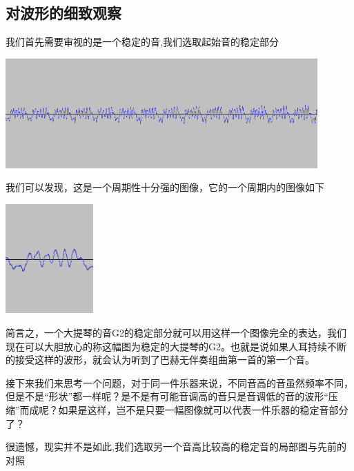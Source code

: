 \subsection{对波形的细致观察}
\par
我们首先需要审视的是一个稳定的音,我们选取起始音的稳定部分
\vspace{1cm}
\begin{center}
    \includegraphics[height=4.2cm]{celloFirstStable.png}
\end{center}
\vspace{1cm}
\par
\vspace{1cm}
我们可以发现，这是一个周期性十分强的图像，它的一个周期内的图像如下
\vspace{1cm}
\begin{center}
    \includegraphics[height=4.2cm]{celloFirstStableBig.png}
\end{center}
\vspace{1cm}
\par
简言之，一个大提琴的音G2的稳定部分就可以用这样一个图像完全的表达，我们现在可以大胆放心的称这幅图为稳定的大提琴的G2。也就是说如果人耳持续不断的接受这样的波形，就会认为听到了巴赫无伴奏组曲第一首的第一个音。
\par
接下来我们来思考一个问题，对于同一件乐器来说，不同音高的音虽然频率不同，但是不是“形状”都一样呢？是不是有可能音调高的音只是音调低的音的波形“压缩”而成呢？如果是这样，岂不是只要一幅图像就可以代表一件乐器的稳定音部分了？
\par
很遗憾，现实并不是如此,我们选取另一个音高比较高的稳定音的局部图与先前的对照
\vspace{1cm}
